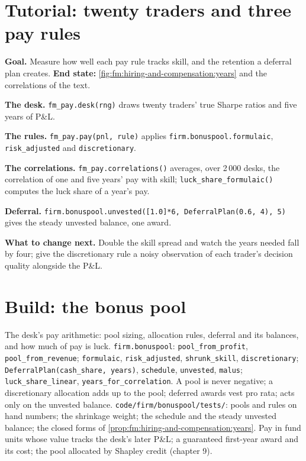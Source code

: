 \section{Tutorial: twenty traders and three pay rules}\label{tut:fm:hiring-and-compensation:tut}

\begin{tutorial}
\textbf{Goal.} Measure how well each pay rule tracks skill, and the retention a deferral plan creates. \textbf{End state:}
\cref{fig:fm:hiring-and-compensation:years} and the correlations of the text.
\begin{tutsteps}
\item \textbf{The desk.} \texttt{fm\_pay.desk(rng)} draws twenty traders' true Sharpe ratios and five years of P\&L.
\item \textbf{The rules.} \texttt{fm\_pay.pay(pnl, rule)} applies \texttt{firm.bonuspool.formulaic}, \texttt{risk\_adjusted} and
\texttt{discretionary}.
\item \textbf{The correlations.} \texttt{fm\_pay.correlations()} averages, over 2\,000 desks, the correlation of one and five years' pay with skill;
\texttt{luck\_share\_formulaic()} computes the luck share of a year's pay.
\item \textbf{Deferral.} \texttt{firm.bonuspool.unvested([1.0]*6, DeferralPlan(0.6, 4), 5)} gives the steady unvested balance, one award.
\end{tutsteps}
\end{tutorial}

\textbf{What to change next.} Double the skill spread and watch the years needed fall by four; give the discretionary rule a noisy observation of
each trader's decision quality alongside the P\&L.

\section{Build: the bonus pool}\label{bld:fm:hiring-and-compensation:bonuspool}

\begin{build}
 The desk's pay arithmetic: pool sizing, allocation rules, deferral and its balances, and how much of pay is luck.
 \texttt{firm.bonuspool}: \texttt{pool\_from\_profit}, \texttt{pool\_from\_revenue}; \texttt{formulaic}, \texttt{risk\_adjusted},
\texttt{shrunk\_skill}, \texttt{discretionary}; \texttt{DeferralPlan(cash\_share, years)}, \texttt{schedule}, \texttt{unvested}, \texttt{malus};
\texttt{luck\_share\_linear}, \texttt{years\_for\_correlation}.
 A pool is never negative; a discretionary allocation adds up to the pool; deferred awards vest pro rata;  acts only on the
unvested balance.
 \texttt{code/firm/bonuspool/tests/}: pools and rules on hand numbers; the shrinkage weight; the schedule and the steady
unvested balance; the closed forms of \cref{prop:fm:hiring-and-compensation:years}.
 Pay in fund units whose value tracks the desk's later P\&L; a guaranteed first-year award and its cost; the pool allocated by
Shapley credit (chapter 9).
\end{build}

